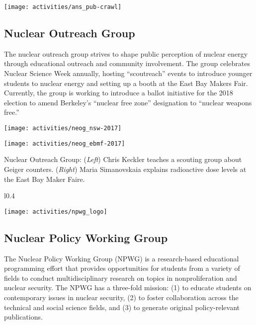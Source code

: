 \vspace{1.0cm}
\begin{center}
	\texttt{[image: activities/ans\_pub-crawl]}
\end{center}

\clearpage
\subsection*{Nuclear Outreach Group}
The nuclear outreach group strives to shape public perception of nuclear energy through educational outreach and community involvement. 
The group celebrates Nuclear Science Week annually, hosting “scoutreach” events to introduce younger students to nuclear energy and setting up a booth at the East Bay Makers Fair. 
Currently, the group is working to introduce a ballot initiative for the 2018 election to amend Berkeley’s “nuclear free zone” designation to “nuclear weapons free.”

\vspace{0.5cm}
\begin{minipage}{0.5\textwidth}
	\texttt{[image: activities/neog\_nsw-2017]}
\end{minipage}
\begin{minipage}{0.5\textwidth}
	\texttt{[image: activities/neog\_ebmf-2017]}
\end{minipage}
\vspace{0.2cm}

Nuclear Outreach Group: (\textit{Left}) Chris Keckler teaches a scouting group about Geiger counters. (\textit{Right}) Maria Simanovskaia explains radioactive dose levels at the East Bay Maker Faire.

\vspace{2cm}

\begin{wrapfigure}{l}{0.4\textwidth}
	\begin{center}
		\vspace{-0.5cm}
		\texttt{[image: activities/npwg\_logo]}
	\end{center}
\end{wrapfigure}

\subsection*{Nuclear Policy Working Group}

The Nuclear Policy Working Group (NPWG) is a research-based educational programming effort that provides opportunities for students from a variety of fields to conduct multidisciplinary research on topics in nonproliferation and nuclear security. 
The NPWG has a three-fold mission: (1) to educate students on contemporary issues in nuclear security, (2) to foster collaboration across the technical and social science fields, and (3) to generate original policy-relevant publications. 

